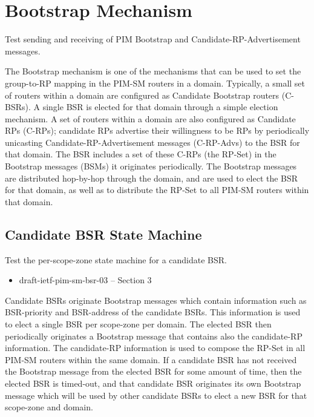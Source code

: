 \documentclass[11pt]{report}
\begin{document}
\chapter{Bootstrap Mechanism}

Test sending and receiving of PIM Bootstrap and Candidate-RP-Advertisement
messages.

The Bootstrap mechanism is one of the mechanisms that can be used
to set the group-to-RP mapping in the PIM-SM routers in a domain.
Typically, a small set of routers within a domain are configured as Candidate
Bootstrap routers (C-BSRs). A single BSR is elected for that domain through a
simple election mechanism. A set of routers within a domain are also
configured as Candidate RPs (C-RPs); candidate RPs advertise their willingness
to be RPs by periodically unicasting Candidate-RP-Advertisement messages
(C-RP-Advs) to the BSR for that domain. The BSR includes a set of these C-RPs
(the RP-Set) in the Bootstrap messages (BSMs) it originates periodically. The
Bootstrap messages are distributed hop-by-hop through the domain, and are used
to elect the BSR for that domain, as well as to distribute the RP-Set to all
PIM-SM routers within that domain.

\newpage
\section{Candidate BSR State Machine}

Test the per-scope-zone state machine for a candidate BSR.

\begin{itemize}
  \item draft-ietf-pim-sm-bsr-03 -- Section 3
\end{itemize}

Candidate BSRs originate Bootstrap messages which contain information such as
BSR-priority and BSR-address of the candidate BSRs.
This information is used
to elect a single BSR per scope-zone per domain. The elected BSR then
periodically originates a Bootstrap message that contains also the
candidate-RP information. The candidate-RP information is used to compose the
RP-Set in all PIM-SM routers within the same domain. If a candidate BSR has
not received the Bootstrap message from the elected BSR for some amount of
time, then the elected BSR is timed-out, and that candidate BSR originates its
own Bootstrap message which will be used by other candidate BSRs to elect a
new BSR for that scope-zone and domain.
\end{document}

